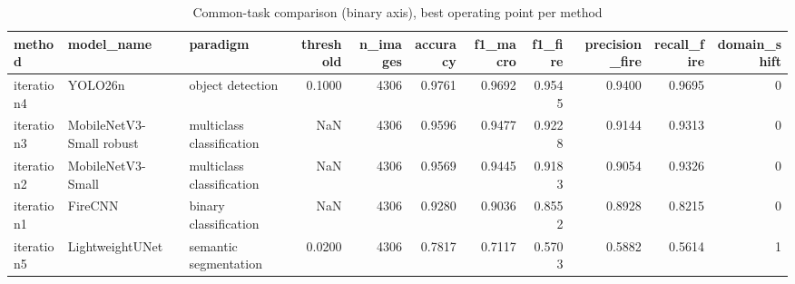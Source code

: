 \begin{table}
\caption{Common-task comparison (binary axis), best operating point per method}
\begin{tabular}{lllrrrrrrrr}
\toprule
method & model\_name & paradigm & threshold & n\_images & accuracy & f1\_macro & f1\_fire & precision\_fire & recall\_fire & domain\_shift \\
\midrule
iteration4 & YOLO26n & object detection & 0.1000 & 4306 & 0.9761 & 0.9692 & 0.9545 & 0.9400 & 0.9695 & 0 \\
iteration3 & MobileNetV3-Small robust & multiclass classification & NaN & 4306 & 0.9596 & 0.9477 & 0.9228 & 0.9144 & 0.9313 & 0 \\
iteration2 & MobileNetV3-Small & multiclass classification & NaN & 4306 & 0.9569 & 0.9445 & 0.9183 & 0.9054 & 0.9326 & 0 \\
iteration1 & FireCNN & binary classification & NaN & 4306 & 0.9280 & 0.9036 & 0.8552 & 0.8928 & 0.8215 & 0 \\
iteration5 & LightweightUNet & semantic segmentation & 0.0200 & 4306 & 0.7817 & 0.7117 & 0.5703 & 0.5882 & 0.5614 & 1 \\
\bottomrule
\end{tabular}
\end{table}
